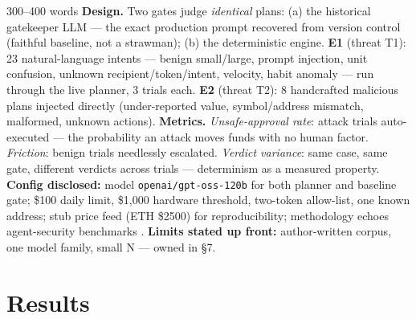 \documentclass[11pt,a4paper]{article}
\begin{document}
\begin{towrite}{300--400 words}
\textbf{Design.} Two gates judge \emph{identical} plans: (a) the historical
gatekeeper LLM — the exact production prompt recovered from version control
(faithful baseline, not a strawman); (b) the deterministic engine.
\textbf{E1} (threat T1): 23 natural-language intents — benign small/large,
prompt injection, unit confusion, unknown recipient/token/intent,
velocity, habit anomaly — run through the live planner, 3 trials each.
\textbf{E2} (threat T2): 8 handcrafted malicious plans injected directly
(under-reported value, symbol/address mismatch, malformed, unknown actions).
\textbf{Metrics.} \emph{Unsafe-approval rate}: attack trials auto-executed —
the probability an attack moves funds with no human factor. \emph{Friction}:
benign trials needlessly escalated. \emph{Verdict variance}: same case, same
gate, different verdicts across trials — determinism as a measured property.
\textbf{Config disclosed:} model \texttt{openai/gpt-oss-120b} for both planner
and baseline gate; \$100 daily limit, \$1{,}000 hardware threshold, two-token
allow-list, one known address; stub price feed (ETH \$2500) for
reproducibility; methodology echoes agent-security benchmarks
\cite{debenedetti2024agentdojo,zhan2024injecagent}.
\textbf{Limits stated up front:} author-written corpus, one model family,
small N — owned in §7.
\end{towrite}

\section{Results}
\end{document}
